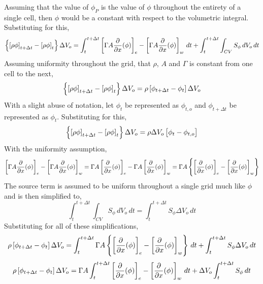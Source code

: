 \documentclass[a4paper, 12pt]{report}
\begin{document}
\begin{center}
Assuming that the value of $\phi_P$ is the value of $\phi$ throughout the entirety of a single cell, then $\phi$ would be a constant with respect to the volumetric integral. Substituting for this,
$$\left\{\left[\rho \phi\right]_{t+\Delta t} - \left[\rho \phi\right]_{t}\right\}\Delta V_o = \int^{t+\Delta t}_{t}\left[\Gamma A\frac{\partial}{\partial x}(\phi)\right]_{e} - \left[\Gamma A\frac{\partial}{\partial x}(\phi)\right]_{w}\,dt + \int^{t+\Delta t}_{t}\int_{CV}S_\phi\,dV_o\,dt$$
Assuming uniformity throughout the grid, that $\rho$, $A$ and $\Gamma$ is constant from one cell to the next,
$$\left\{\left[\rho \phi\right]_{t+\Delta t} - \left[\rho \phi\right]_{t}\right\}\Delta V_o = \rho \left[\phi_{t+\Delta t} - \phi_{t}\right]\Delta V_o$$
With a slight abuse of notation, let $\phi_{t}$ be represented as $\phi_{t,o}$ and $\phi_{t+\Delta t}$ be represented as $\phi_{t}$. Substituting for this,
$$\left\{\left[\rho \phi\right]_{t+\Delta t} - \left[\rho \phi\right]_{t}\right\}\Delta V_o = \rho\Delta V_o \left[\phi_{t} - \phi_{t,o}\right]$$
With the uniformity assumption,
$$\left[\Gamma A\frac{\partial}{\partial x}(\phi)\right]_{e} - \left[\Gamma A\frac{\partial}{\partial x}(\phi)\right]_{w} = \Gamma A\left[\frac{\partial}{\partial x}(\phi)\right]_{e} - \Gamma A\left[\frac{\partial}{\partial x}(\phi)\right]_{w} = \Gamma A\left\{\left[\frac{\partial}{\partial x}(\phi)\right]_{e} - \left[\frac{\partial}{\partial x}(\phi)\right]_{w}\right\}$$
The source term is assumed to be uniform throughout a single grid much like $\phi$ and is then simplified to,
$$\int^{t+\Delta t}_{t}\int_{CV}S_\phi\,dV_o\,dt = \int^{t+\Delta t}_{t} S_\phi\Delta V_o\,dt$$
Substituting for all of these simplifications,
$$\rho \left[\phi_{t+\Delta t} - \phi_{t}\right]\Delta V_o = \int^{t+\Delta t}_{t}\Gamma A\left\{\left[\frac{\partial}{\partial x}(\phi)\right]_{e} - \left[\frac{\partial}{\partial x}(\phi)\right]_{w}\right\}\,dt + \int^{t+\Delta t}_{t} S_\phi\Delta V_o\,dt$$
$$\rho \left[\phi_{t+\Delta t} - \phi_{t}\right]\Delta V_o = \Gamma A\int^{t+\Delta t}_{t}\left[\frac{\partial}{\partial x}(\phi)\right]_{e} - \left[\frac{\partial}{\partial x}(\phi)\right]_{w}\,dt + \Delta V_o\int^{t+\Delta t}_{t} S_\phi\,dt$$

\end{center}
\end{document}
